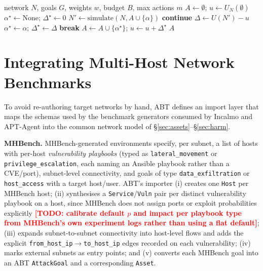 \documentclass[conference]{IEEEtran}
\newcommand{\todo}[1]{\textcolor{red}{\textbf{[TODO: #1]}}}
\begin{document}
\begin{algorithm}[t]
\caption{Greedy marginal-utility defence planning}
\label{alg:planner}
\begin{algorithmic}[1]
\Require network $N$, goals $G$, weights $w$, budget $B$, max actions $m$
\State $A \gets \emptyset$; $u \gets U_N(\emptyset)$ 
  \State $\alpha^\star \gets \mathrm{None}$; $\Delta^\star \gets 0$
    \State $N' \gets \mathrm{simulate}(N, A\cup\{\alpha\})$
     \textbf{continue} \EndIf
    \State $\Delta \gets U(N') - u$
    \If{$\Delta > \Delta^\star$} $\alpha^\star \gets \alpha$; $\Delta^\star\gets\Delta$ \EndIf
  \EndFor
   \textbf{break} \EndIf
  \State $A \gets A \cup \{\alpha^\star\}$; $u \gets u + \Delta^\star$
\EndFor
\State \Return $A$
\end{algorithmic}
\end{algorithm}

\section{Integrating Multi-Host Network Benchmarks}
\label{sec:integration}

To avoid re-authoring target networks by hand, ABT defines an import layer that maps
the schemas used by the benchmark generators consumed by Incalmo and APT-Agent into
the common network model of \S\ref{sec:assets}--\S\ref{sec:harm}.

\textbf{MHBench.} MHBench-generated environments specify, per subnet, a list of hosts
with per-host \emph{vulnerability playbooks} (typed as \texttt{lateral\_movement} or
\texttt{privilege\_escalation}, each naming an Ansible playbook rather than a CVE/port),
subnet-level connectivity, and goals of type \texttt{data\_exfiltration} or
\texttt{host\_access} with a target host/user. ABT's importer (i) creates one
\texttt{Host} per MHBench host; (ii) synthesises a \texttt{Service}/\texttt{Vuln} pair
per distinct vulnerability playbook on a host, since MHBench does not assign ports or
exploit probabilities explicitly \todo{calibrate default $p$ and impact per playbook
type from MHBench's own experiment logs rather than using a flat default}; (iii)
expands subnet-to-subnet connectivity into host-level flows and adds the explicit
\texttt{from\_host\_ip}$\to$\texttt{to\_host\_ip} edges recorded on each vulnerability;
(iv) marks external subnets as entry points; and (v) converts each MHBench goal into
an ABT \texttt{AttackGoal} and a corresponding \texttt{Asset}.
\end{document}
